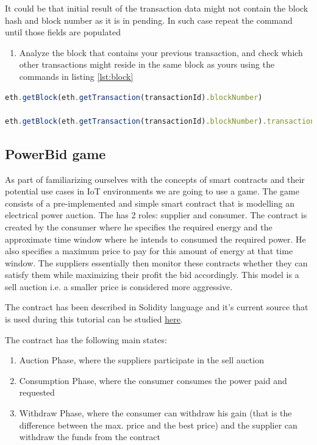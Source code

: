 \documentclass[a4paper]{article}
\begin{document}
It could be that initial result of the transaction data might not contain the block hash and block number as it is in pending. In such case repeat the  command until those fields are populated

\begin{enumerate}[label=\textbf{Task \arabic*}:,l_tasks]
\item Analyze the block that contains your previous transaction, and check which other transactions might reside in the same block as yours using the commands in listing \ref{lst:block}
\end{enumerate}

\begin{lstlisting}[language=javascript,caption={Functions for analyzing a block},label={lst:block}]
eth.getBlock(eth.getTransaction(transactionId).blockNumber)

eth.getBlock(eth.getTransaction(transactionId).blockNumber).transactions.map(function(tx){return eth.getTransaction(tx);})
\end{lstlisting}

\subsection{PowerBid game}

As part of familiarizing ourselves with the concepts of smart contracts and their potential use cases in IoT environments we are going to use a game. The game consists of a pre-implemented and simple smart contract that is modelling an electrical power auction. The has 2 roles: supplier and consumer. The contract is created by the consumer where he specifies the required energy and the approximate time window where he intends to consumed the required power. He also specifies a maximum price to pay for this amount of energy at that time window. The suppliers essentially then monitor these contracts whether they can satisfy them while maximizing their profit the bid accordingly. This model is a sell auction i.e. a smaller price is considered more aggressive. 

The contract has been described in Solidity language and it's current source that is used during this tutorial can be studied \href{https://raw.githubusercontent.com/fecjanky/iot_sc_tutorial/v1.0.6/src/powerbid.sol}{here}.

The contract has the following main states:
\begin{enumerate}
    \item Auction Phase, where the suppliers participate in the sell auction
    \item Consumption Phase, where the consumer consumes the power paid and requested
    \item Withdraw Phase, where the consumer can withdraw his gain (that is the difference between the max. price and the best price) and the supplier can withdraw the funds from the contract
\end{enumerate}
\end{document}
